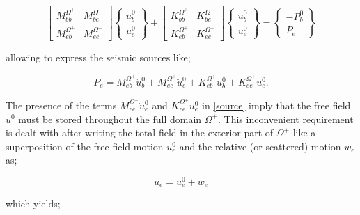 \documentclass[12pt,letterpaper]{article}
\begin{document}
\begin{equation}
\left[ {\begin{array}{*{20}{c}}
{M_{bb}^{{\Omega ^ + }}}&{M_{be}^{{\Omega ^ + }}}\\
{M_{eb}^{{\Omega ^ + }}}&{M_{ee}^{{\Omega ^ + }}}
\end{array}} \right]\left\{ {\begin{array}{*{20}{c}}
{\ddot u_b^0}\\
{\ddot u_e^0}
\end{array}} \right\} + \left[ {\begin{array}{*{20}{c}}
{K_{bb}^{{\Omega ^ + }}}&{K_{be}^{{\Omega ^ + }}}\\
{K_{eb}^{{\Omega ^ + }}}&{K_{ee}^{{\Omega ^ + }}}
\end{array}} \right]\left\{ {\begin{array}{*{20}{c}}
{u_b^0}\\
{u_e^0}
\end{array}} \right\} = \left\{ {\begin{array}{*{20}{c}}
{ - P_b^0}\\
{{P_e}}
\end{array}} \right\}
\label{ffield}
\end{equation}

allowing to express the seismic sources like;


\begin{equation}
{P_e} = M_{eb}^{{\Omega ^ + }}\ddot u_b^0 + M_{ee}^{{\Omega ^ + }}\ddot u_e^0 + K_{eb}^{{\Omega ^ + }}u_b^0 + K_{ee}^{{\Omega ^ + }}u_e^0.
\label{source}
\end{equation}

The presence of the terms $M_{ee}^{{\Omega ^ + }}\ddot u_e^0$ and ${K_{ee}^{{\Omega ^ + }}u_e^0}$ in \cref{source} imply that the free field $u^0$ must be stored throughout the full domain $\Omega^+$. This inconvenient requirement is dealt with after writing the total field in the exterior part of $\Omega^+$ like a superposition of the free field motion $u_e^0$ and the relative (or scattered) motion $w_e$ as;

\begin{equation}
u_e=u_e^0+w_e
\label{relative}
\end{equation}

which yields;
\end{document}
